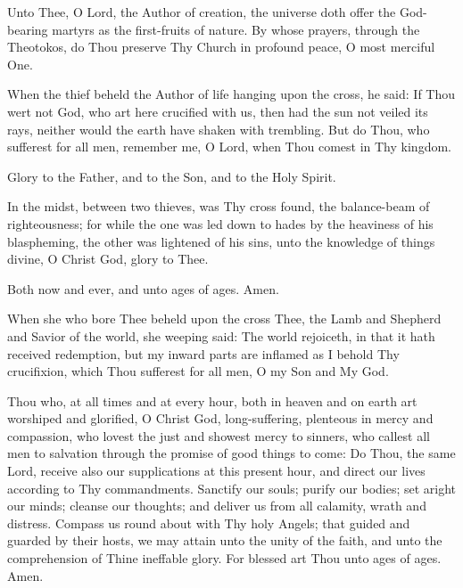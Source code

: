 {\begin{maybetwocolumns}

Unto Thee, O Lord, the Author of creation, the universe doth offer the God-bearing
martyrs as the first-fruits of nature. By whose prayers, through the Theotokos,
do Thou preserve Thy Church in profound peace, O most merciful One.


When the thief beheld the Author of life hanging upon the cross, he said:
If Thou wert not God, who art here crucified with us,
then had the sun not veiled its rays,
neither would the earth have shaken with trembling.
But do Thou, who sufferest for all men, remember me,
O Lord, when Thou comest in Thy kingdom.

\vbox{}
Glory to the Father, and to the Son, and to the Holy Spirit.

\vbox{}
In the midst, between two thieves, was Thy cross found, the balance-beam of
righteousness; for while the one was led down to hades by the heaviness of his
blaspheming, the other was lightened of his sins,
unto the knowledge of things divine, O Christ God, glory to Thee.

\vbox{}
Both now and ever, and unto ages of ages. Amen.

\vbox{}
When she who bore Thee beheld upon the cross Thee, the Lamb and Shepherd and Savior
of the world, she weeping said: The world rejoiceth, in that it hath received redemption,
but my inward parts are inflamed as I behold Thy crucifixion, which Thou sufferest for all
men, O my Son and My God.

\readerline{\lhmForty}

Thou who, at all times and at every hour, both in heaven and on earth art
worshiped and glorified, O Christ God, long-suffering, plenteous in mercy
and compassion, who lovest the just and showest mercy to sinners, who callest
all men to salvation through the promise of good things to come: Do Thou, the
same Lord, receive also our supplications at this present hour, and direct our
lives according to Thy commandments. Sanctify our souls; purify our bodies;
set aright our minds; cleanse our thoughts; and deliver us from all calamity,
wrath and distress. Compass us round about with Thy holy Angels; that
guided and guarded by their hosts, we may attain unto the unity of the faith,
and unto the comprehension of Thine ineffable glory. For blessed art Thou unto
ages of ages. Amen.
\end{maybetwocolumns}

}
